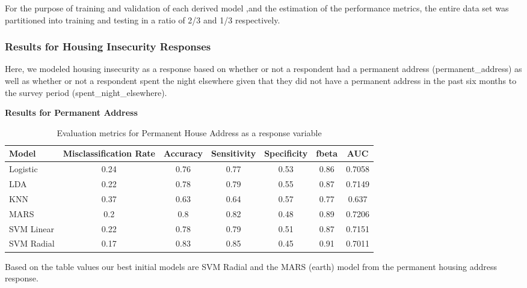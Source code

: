 \documentclass[
  10pt,
]{article}
\begin{document}
For the purpose of training and validation of each derived model ,and the estimation of the performance metrics, the entire data set was partitioned into training and testing in a ratio of 2/3 and 1/3 respectively.

\hypertarget{results-for-housing-insecurity-responses}{%
\subsubsection{Results for Housing Insecurity Responses}\label{results-for-housing-insecurity-responses}}

Here, we modeled housing insecurity as a response based on whether or not a respondent had a permanent address (permanent\_address) as well as whether or not a respondent spent the night elsewhere given that they did not have a permanent address in the past six months to the survey period (spent\_night\_elsewhere).

\textbf{Results for Permanent Address}

\begin{table}[H]

\caption{\label{tab:unnamed-chunk-9}Evaluation metrics for Permanent House Address  as a response variable}
\centering
\fontsize{12}{14}\selectfont
\begin{tabular}[t]{lcccccc}
\toprule
Model & Misclassification Rate & Accuracy & Sensitivity & Specificity & fbeta & AUC\\
\midrule
Logistic & 0.24 & 0.76 & 0.77 & 0.53 & 0.86 & 0.7058\\
LDA & 0.22 & 0.78 & 0.79 & 0.55 & 0.87 & 0.7149\\
KNN & 0.37 & 0.63 & 0.64 & 0.57 & 0.77 & 0.637\\
MARS & 0.2 & 0.8 & 0.82 & 0.48 & 0.89 & 0.7206\\
SVM Linear & 0.22 & 0.78 & 0.79 & 0.51 & 0.87 & 0.7151\\
SVM Radial & 0.17 & 0.83 & 0.85 & 0.45 & 0.91 & 0.7011\\
\bottomrule
\end{tabular}
\end{table}

Based on the table values our best initial models are SVM Radial and the MARS (earth) model from the permanent housing address response.\\
\end{document}
